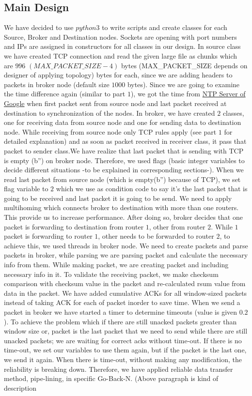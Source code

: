 \subsection{Main Design}
We have decided to use $python3$ to write scripts and create classes for each Source, Broker and Destination nodes. Sockets are opening with port numbers and IPs are assigned in constructors for all classes in our design. In source class we have created TCP connection and read the given large file as chunks which are $996$ $(MAX\_PACKET\_SIZE - 4)$ bytes (MAX\_PACKET\_SIZE depends on designer of applying topology) bytes for each, since we are adding headers to packets in broker node (default size $1000$ bytes). Since we are going to examine the time difference again (similar to part $1$), we got the time from \href{https://developers.google.com/time/}{NTP Server of Google} when first packet sent from source node and last packet received at destination to synchronization of the nodes. In broker, we have created $2$ classes, one for receiving data from source node and one for sending data to destination node. While receiving from source node only TCP rules apply (see part $1$ for detailed explanation) and as soon as packet received in receiver class, it pass that packet to sender class.We have realize that last packet that is sending with TCP is empty (b'') on broker node. Therefore, we used flags (basic integer variables to decide different situations -to be explained in corresponding sections-). When we read last packet from source node (which is empty(b'') because of TCP), we set flag variable to $2$ which we use as condition code to say it's the last packet that is going to be received and last packet it is going to be send. We need to apply multihoming which connects broker to destination with more than one routers. This provide us to increase performance. After doing so, broker decides that one packet is forwarding to destination from router $1$, other from router $2$. While $1$ packet is forwarding to router $1$, other needs to be forwarded to router $2$, to achieve this, we used threads in broker node. We need to create packets and parse packets in broker, while parsing we are parsing packet and calculate the necessary info from them. While making packet, we are creating packet and including necessary info in it. To validate the receiving packet, we make checksum comparison with checksum value in the packet and re-calculated rsum value from data in the packet. We have added cumulative ACKs for all window-sized packets instead of taking ACK for each of packet inorder to save time. When we send a packet in broker we have started a timer to determine timeouts (value is given $0.2$). To achieve the problem which if there are still unacked packets greater than window size or, packet is the last packet that we need to send while there are still unacked packets; we are waiting for correct acks without time-out. If there is no time-out, we set our variables to use them again, but if the packet is the last one, we send it again. When there is time-out, without making any modification, the reliability is breaking down. Therefore, we have applied reliable data transfer method, pipe-lining, in specific Go-Back-N. (Above paragraph is kind of description 